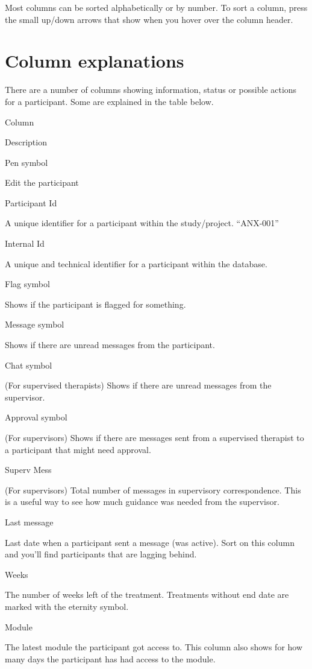 \documentclass[
]{book}
\begin{document}
Most columns can be sorted alphabetically or by number. To sort a column, press the small up/down arrows that show when you hover over the column header.

\section{Column explanations}\label{column-explanations}

There are a number of columns showing information, status or possible actions for a participant. Some are explained in the table below.

Column

Description

Pen symbol

Edit the participant

Participant Id

A unique identifier for a participant within the study/project. ``ANX-001''

Internal Id

A unique and technical identifier for a participant within the database.

Flag symbol

Shows if the participant is flagged for something.

Message symbol

Shows if there are unread messages from the participant.

Chat symbol

(For supervised therapists)
Shows if there are unread messages from the supervisor.

Approval symbol

(For supervisors)
Shows if there are messages sent from a supervised therapist to a participant that might need approval.

Superv Mess

(For supervisors)
Total number of messages in supervisory correspondence. This is a useful way to see how much guidance was needed from the supervisor.

Last message

Last date when a participant sent a message (was active). Sort on this column and you'll find participants that are lagging behind.

Weeks

The number of weeks left of the treatment.
Treatments without end date are marked with the eternity symbol.

Module

The latest module the participant got access to. This column also shows for how many days the participant has had access to the module.
\end{document}
